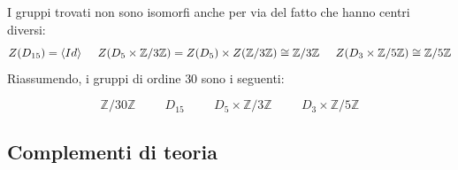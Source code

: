 \documentclass[12pt]{scrartcl}
\theoremstyle{style}
\newenvironment{boxenv}[1][]{
    \begin{eqbox}[#1]
    }{
   \end{eqbox}
}
\numberwithin{equation}{subsection}
\begin{document}
I gruppi trovati non sono isomorfi anche per via del fatto che hanno centri diversi:
\[
Z(D_{15}) = \langle Id \rangle \hspace{.5cm}Z(D_5\times \mathbb{Z}/3\mathbb{Z}) = Z(D_5) \times Z(\mathbb{Z}/3\mathbb{Z}) \cong \mathbb{Z}/3\mathbb{Z} \hspace{.5cm}Z(D_3\times \mathbb{Z}/5\mathbb{Z}) \cong \mathbb{Z}/5\mathbb{Z}
\] 
Riassumendo, i gruppi di ordine $30$ sono i seguenti:
\begin{boxenv}[]
\[
\mathbb{Z}/30\mathbb{Z} \hspace{1cm}D_{15}\hspace{1cm}D_5 \times \mathbb{Z}/3\mathbb{Z} \hspace{1cm}D_3 \times \mathbb{Z}/5\mathbb{Z}
\] 
\end{boxenv}

\newpage
\subsection{Complementi di teoria}
\end{document}
